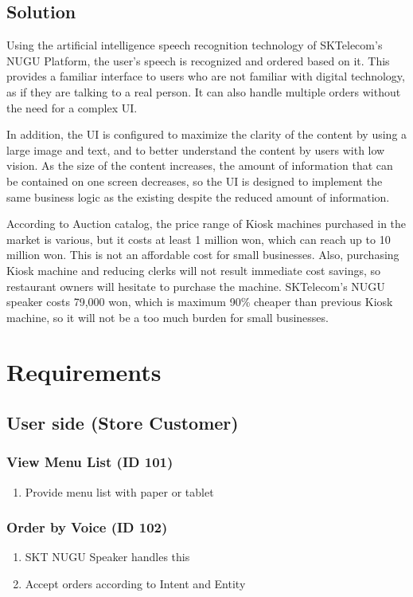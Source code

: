 \documentclass[conference,compsoc]{IEEEtran}
\begin{document}
\subsection{Solution}
Using the artificial intelligence speech recognition technology of SKTelecom's NUGU Platform, the user's speech is recognized and ordered based on it. This provides a familiar interface to users who are not familiar with digital technology, as if they are talking to a real person. It can also handle multiple orders without the need for a complex UI.

In addition, the UI is configured to maximize the clarity of the content by using a large image and text, and to better understand the content by users with low vision. As the size of the content increases, the amount of information that can be contained on one screen decreases, so the UI is designed to implement the same business logic as the existing despite the reduced amount of information.

According to Auction catalog, the price range of Kiosk machines purchased in the market is various, but it costs at least 1 million won, which can reach up to 10 million won. This is not an affordable cost for small businesses. Also, purchasing Kiosk machine and reducing clerks will not result immediate cost savings, so restaurant owners will hesitate to purchase the machine. SKTelecom's NUGU speaker costs 79,000 won, which is maximum 90\% cheaper than previous Kiosk machine, so it will not be a too much burden for small businesses.

\section{Requirements}

\subsection{User side (Store Customer)}

\subsubsection{View Menu List (ID 101)}
\begin{enumerate}
  \item Provide menu list with paper or tablet
\end{enumerate}

\subsubsection{Order by Voice (ID 102)}
\begin{enumerate}
  \item SKT NUGU Speaker handles this
  \item Accept orders according to Intent and Entity
\end{enumerate}
\end{document}
